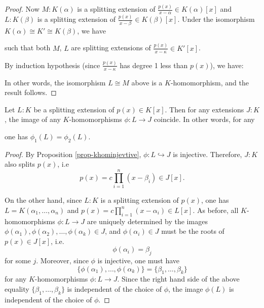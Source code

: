\begin{proof}
Now $M:K(\alpha)$ is a splitting extension of $\frac{p(x)}{x - \alpha} \in K(\alpha)[x]$ and $L:K(\beta)$ is a splitting extension of $\frac{p(x)}{x - \beta} \in K(\beta)[x]$. Under the isomorphism $ K(\alpha) \cong K' \cong K(\beta)$, we have
\begin{center} 
\end{center}
such that both $M$, $L$ are splitting extensions of $\frac{p(x)}{x - \kappa} \in K'[x]$. 

By induction hypothesis (since $\frac{p(x)}{x - \kappa}$ has degree 1 less than $p(x)$), we have:
\begin{center} 
\end{center}
In other words, the isomorphism $L \cong M$ above is a $K$-homomorphism, and the result follows.
\end{proof}

\begin{theorem} \label{thm-splittingfieldsameimage}
Let $L:K$ be a splitting extension of $p(x) \in K[x]$. Then for any extensions $J:K$, the image of any $K$-homomorphisms $\phi: L \to J$ coincide. In other words, for any
\begin{center}
\end{center}
one has $\phi_1(L) = \phi_2(L)$.
\end{theorem}

\begin{proof}
By Proposition \ref{prop-khominjevtive}, $\phi: L \hookrightarrow J$ is injective. Therefore, $J:K$ also splits $p(x)$, i.e 
$$p(x) = c \prod_{i=1}^n (x-\beta_i) \in J[x].$$ 

On the other hand, since $L:K$ is a splitting extension of $p(x)$, one has $L = K(\alpha_1, \dots,\alpha_n)$ and
$\displaystyle p(x) = c \prod_{i=1}^n (x-\alpha_i) \in L[x]$.
As before, all $K$-homomorphisms $\phi: L \to J$ are uniquely determined by the images $\phi(\alpha_1), \phi(\alpha_2), \ldots, \phi(\alpha_k) \in J$, and $\phi(\alpha_i) \in J$ must be the roots of $p(x) \in J[x]$, i.e.
$$\phi(\alpha_i) = \beta_j$$
for some $j$. Moreover, since $\phi$ is injective, one must have
$$\{\phi(\alpha_1), \ldots, \phi(\alpha_k)\} = \{\beta_1, \ldots, \beta_k\}$$
for any $K$-homomorphisms $\phi: L \to J$. Since the right hand side of the above equality $\{\beta_1, \ldots, \beta_k\}$ is independent of the choice of $\phi$, the image $\phi(L)$ is independent of the choice of $\phi$.
\end{proof}

